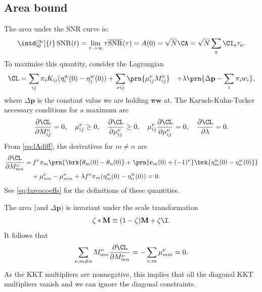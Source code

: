 \documentclass[12pt]{article}
\newcommand{\prm}{p}
\newcommand{\pr}{\mathbf{\prm}}
\newcommand{\eqm}{\pi}
\newcommand{\eq}{\boldsymbol{\eqm}}
\newcommand{\etwm}{\eta^w}
\newcommand{\thbm}{\theta}
\newcommand{\wm}{w}
\newcommand{\w}{\mathbf{\wm}}
\newcommand{\MMdm}{M}
\newcommand{\MMd}{\mathbf{\MMdm}}
\newcommand{\encm}{K}
\DeclareMathOperator{\snr}{SNR}
\newcommand{\snrb}{\overline{\snr}}
\renewcommand{\pdiff}[2]{\frac{\partial #1}{\partial #2}}
\begin{document}

\subsection{Area bound}\label{sec:area}

The area under the SNR curve is:
%
\begin{equation}\label{eq:areadef}
  \intd[_0^\infty]{t} \snr(t) = \lim_{\tau\to\infty} \tau \snrb(\tau) 
      = A(0) = \sqrt{N} \CA = \sqrt{N} \sum_a \CI_a \tau_a.
\end{equation}
%
To maximise this quantity, consider the Lagrangian
%
\begin{equation}\label{eq:arealagrangian}
\begin{aligned}
  \CL =&\, \sum_{ij} \eqm_i \encm_{ij} (\etwm_i(0) - \etwm_j(0))
        +\sum_{\nu i j} \prn{ \mu^\nu_{ij} \MMdm^\nu_{ij} }
        &+ \lambda \prn{ \Delta\pr - \sum_i \eqm_i \wm_i },
\end{aligned}
\end{equation}
%
where \(\Delta\pr\) is the constant value we are holding \(\eq\w\) at.
The Karush-Kuhn-Tucker necessary conditions for a maximum are
%
\begin{equation}\label{eq:KTarea}
  \pdiff{\CL}{\MMdm^\nu_{ij}} = 0, \quad
  \mu^\nu_{ij} \geq 0, \quad
  \pdiff{\CL}{\mu^\nu_{ij}} \geq 0, \quad
  \mu^\nu_{ij}\pdiff{\CL}{\mu^\nu_{ij}} = 0, \quad
  \pdiff{\CL}{\lambda} = 0.
\end{equation}
%
From \cref{eq:lAdiff}, the derivatives for \(m \neq n\) are
%
\begin{equation}\label{eq:areaderivs}
\begin{aligned}
  \pdiff{\CL}{\MMdm^\nu_{mn}} = & \,
    f^\nu \eqm_m \prn{ \brk{\thbm_m(0) - \thbm_n(0)}
     + \prn{\mathbf{c}_m(0) + (-1)^\nu} \brk{\etwm_m(0) - \etwm_n(0)} } \\
     &+ \mu^\nu_{mn} -  \mu^\nu_{mm}
     + \lambda f^\nu \eqm_m (\etwm_{m}(0)-\etwm_{n}(0)) 
    = 0.
\end{aligned}
\end{equation}
%
See \cref{eq:lareacoeffs} for the definitions of these quantities.

The area (and \(\Delta\pr\)) is invariant under the scale transformation
%
\begin{equation}\label{eq:scale}
  \zeta * \MMd \equiv (1-\zeta) \MMd + \zeta \I .
\end{equation}
%
It follows that
%
\begin{equation*}
  \sum_{\nu, m \neq n} \MMdm^\nu_{mn} \pdiff{\CL}{\MMdm^\nu_{mn}} = - \sum_{\nu, m} \mu^\nu_{mm} = 0 .
\end{equation*}
%
As the KKT multipliers are nonnegative, this implies that all the diagonal KKT multipliers vanish and we can ignore the diagonal constraints.
\end{document}

